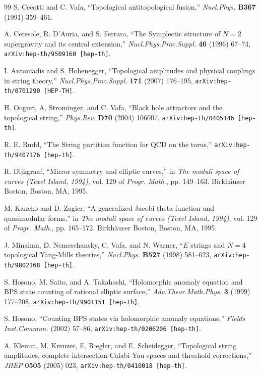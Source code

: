 \begin{thebibliography}{99}
S. Cecotti and C. Vafa, ``Topological antitopological fusion,'' \textit{Nucl.Phys.}
\textbf{B367} (1991) 359--461.

A. Ceresole, R. D'Auria, and S. Ferrara, ``The Symplectic structure of $N=2$ supergravity
and its central extension,'' \textit{Nucl.Phys.Proc.Suppl.} \textbf{46} (1996) 67--74,
\texttt{arXiv:hep-th/9509160 [hep-th]}.

I. Antoniadis and S. Hohenegger, ``Topological amplitudes and physical couplings in string
theory,'' \textit{Nucl.Phys.Proc.Suppl.} \textbf{171} (2007) 176--195,
\texttt{arXiv:hep-th/0701290 [HEP-TH]}.

H. Ooguri, A. Strominger, and C. Vafa, ``Black hole attractors and the topological
string,'' \textit{Phys.Rev.} \textbf{D70} (2004) 106007,
\texttt{arXiv:hep-th/0405146 [hep-th]}.

R. E. Rudd, ``The String partition function for QCD on the torus,''
\texttt{arXiv:hep-th/9407176 [hep-th]}.

R. Dijkgraaf, ``Mirror symmetry and elliptic curves,'' in \textit{The moduli space of curves
(Texel Island, 1994)}, vol. 129 of \textit{Progr. Math.}, pp. 149--163. Birkh\"auser Boston,
Boston, MA, 1995.

M. Kaneko and D. Zagier, ``A generalized Jacobi theta function and quasimodular forms,''
in \textit{The moduli space of curves (Texel Island, 1994)}, vol. 129 of \textit{Progr.
Math.}, pp. 165--172. Birkh\"auser Boston, Boston, MA, 1995.

J. Minahan, D. Nemeschansky, C. Vafa, and N. Warner, ``$E$ strings and $N=4$ topological
Yang-Mills theories,'' \textit{Nucl.Phys.} \textbf{B527} (1998) 581--623,
\texttt{arXiv:hep-th/9802168 [hep-th]}.

S. Hosono, M. Saito, and A. Takahashi, ``Holomorphic anomaly equation and BPS state
counting of rational elliptic surface,'' \textit{Adv.Theor.Math.Phys.} \textbf{3} (1999)
177--208, \texttt{arXiv:hep-th/9901151 [hep-th]}.

S. Hosono, ``Counting BPS states via holomorphic anomaly equations,'' \textit{Fields
Inst.Commun.} (2002) 57--86, \texttt{arXiv:hep-th/0206206 [hep-th]}.

A. Klemm, M. Kreuzer, E. Riegler, and E. Scheidegger, ``Topological string amplitudes,
complete intersection Calabi-Yau spaces and threshold corrections,'' \textit{JHEP}
\textbf{0505} (2005) 023, \texttt{arXiv:hep-th/0410018 [hep-th]}.


\end{thebibliography}
